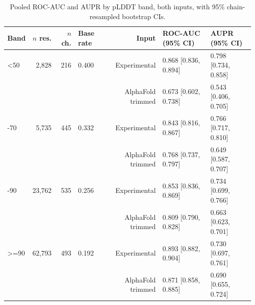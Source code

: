 \documentclass[10pt]{article}
\begin{document}
\begin{table}[t]
\centering
\small
\begin{tabular}{lrrlrlrl}
\toprule
Band & $n$ res. & $n$ ch. & Base rate & Input & ROC-AUC (95\% CI) & \multicolumn{2}{l}{AUPR (95\% CI)} \\
\midrule
<50 & 2,828 & 216 & 0.400 & Experimental & 0.868 [0.836, 0.894] & \multicolumn{2}{l}{0.798 [0.734, 0.858]} \\
 &  &  &  & AlphaFold trimmed & 0.673 [0.602, 0.738] & \multicolumn{2}{l}{0.543 [0.406, 0.705]} \\
\addlinespace
50-70 & 5,735 & 445 & 0.332 & Experimental & 0.843 [0.816, 0.867] & \multicolumn{2}{l}{0.766 [0.717, 0.810]} \\
 &  &  &  & AlphaFold trimmed & 0.768 [0.737, 0.797] & \multicolumn{2}{l}{0.649 [0.587, 0.707]} \\
\addlinespace
70-90 & 23,762 & 535 & 0.256 & Experimental & 0.853 [0.836, 0.869] & \multicolumn{2}{l}{0.734 [0.699, 0.766]} \\
 &  &  &  & AlphaFold trimmed & 0.809 [0.790, 0.828] & \multicolumn{2}{l}{0.663 [0.623, 0.701]} \\
\addlinespace
>=90 & 62,793 & 493 & 0.192 & Experimental & 0.893 [0.882, 0.904] & \multicolumn{2}{l}{0.730 [0.697, 0.761]} \\
 &  &  &  & AlphaFold trimmed & 0.871 [0.858, 0.885] & \multicolumn{2}{l}{0.690 [0.655, 0.724]} \\
\bottomrule
\end{tabular}
\caption{Pooled ROC-AUC and AUPR by pLDDT band, both inputs, with 95\%
chain-resampled bootstrap CIs.}
\label{tab:bands}
\end{table}
\end{document}
